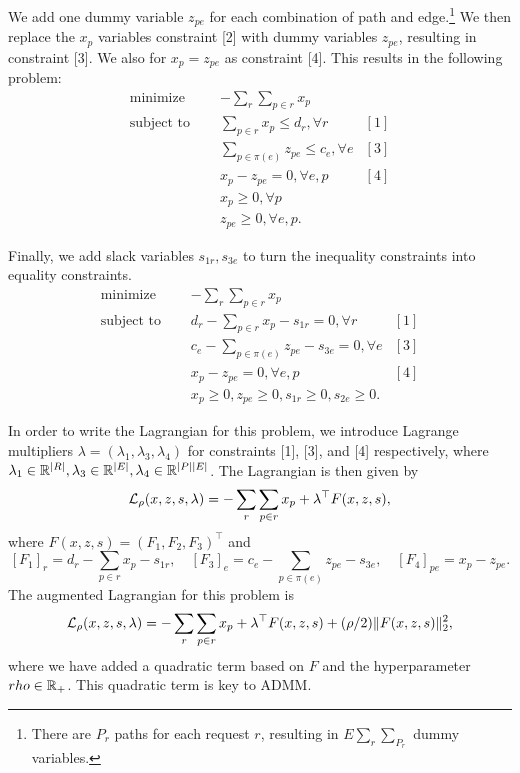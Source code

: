 \documentclass[11pt]{article}
\begin{document}
We add one dummy variable $z_{pe}$ for each combination of path and edge.\footnote{
There are $P_r$ paths for each request $r$, resulting in
$E\sum_r\sum_{P_r}$ dummy variables.}
We then replace the $x_p$ variables constraint [2] with dummy variables $z_{pe}$,
resulting in constraint [3].
We also for $x_p = z_{pe}$ as constraint [4].
This results in the following problem:
\begin{equation}
\label{eqn:network-opt-sep}
\begin{aligned}
\textrm{minimize } \quad & -\sum_r \sum_{p\in r} x_p\\
\textrm{subject to } \quad
&\sum_{p \in r}x_p \le d_r, \forall r & [1]\\
&\sum_{p\in\pi(e)} z_{pe} \le c_e, \forall e & [3]\\
&x_p - z_{pe} = 0, \forall e,p & [4]\\
& x_p \geq 0, \forall p \\
& z_{pe} \geq 0, \forall e,p.
\end{aligned}
\end{equation}

Finally, we add slack variables $s_{1r},s_{3e}$
to turn the inequality constraints into equality constraints.
\begin{equation}
\label{eqn:network-opt-sep-eq}
\begin{aligned}
\textrm{minimize } \quad & -\sum_r \sum_{p\in r} x_p\\
\textrm{subject to } \quad
&d_r - \sum_{p \in r}x_p - s_{1r} = 0, \forall r & [1]\\
&c_e - \sum_{p\in\pi(e)} z_{pe} - s_{3e}= 0, \forall e & [3]\\
&x_p - z_{pe} = 0, \forall e,p & [4]\\
& x_p \geq 0,
z_{pe} \geq 0,
s_{1r} \geq 0,
s_{2e} \geq 0.
\end{aligned}
\end{equation}

In order to write the Lagrangian for this problem,
we introduce Lagrange multipliers
$\lambda = (\lambda_{1},\lambda_{3},\lambda_{4})$
for constraints [1], [3], and [4] respectively,
where $\lambda_1\in\mathbb{R}^{|R|},\lambda_3\in\mathbb{R}^{|E|},\lambda_4\in\mathbb{R}^{|P||E|}$.
The Lagrangian is then given by
\begin{equation}
    \label{eqn:network-lagrangian-std}
    \mathcal{L}_\rho(x,z,s,\lambda) =-\sum_r\sum_{p\in r} x_p + \lambda^\top F(x,z,s),
\end{equation}
where $F(x,z,s) = (F_1, F_2,F_3)^\top$ and
$$
[F_1]_r = d_r - \sum_{p \in r}x_p - s_{1r},\quad
[F_3]_e = c_e - \sum_{p\in\pi(e)} z_{pe} - s_{3e},\quad
[F_4]_{pe} = x_p - z_{pe}.
$$
The augmented Lagrangian for this problem is
\begin{equation}
    \label{eqn:network-lagrangian}
    \mathcal{L}_\rho(x,z,s,\lambda) =-\sum_r\sum_{p\in r} x_p + \lambda^\top F(x,z,s)
        + (\rho/2)\| F(x,z,s) \|_2^2,
\end{equation}
where we have added a quadratic term based on $F$ and the hyperparameter $rho\in\mathbb{R}_+$.
This quadratic term is key to ADMM.
\end{document}
